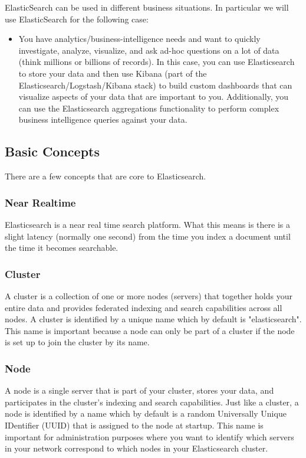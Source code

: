 \documentclass[a4paper, 12pt]{book}
\begin{document}
ElasticSearch can be used in different business situations. In particular we will use ElasticSearch for the following case:

\begin{itemize}
\item You have analytics/business-intelligence needs and want to quickly investigate, analyze, visualize, and ask ad-hoc questions on a lot of data (think millions or billions of records). In this case, you can use Elasticsearch to store your data and then use Kibana (part of the Elasticsearch/Logstash/Kibana stack) to build custom dashboards that can visualize aspects of your data that are important to you. Additionally, you can use the Elasticsearch aggregations functionality to perform complex business intelligence queries against your data.
\end{itemize}

\subsection{Basic Concepts}
There are a few concepts that are core to Elasticsearch.

\subsubsection{Near Realtime}
Elasticsearch is a near real time search platform. What this means is there is a slight latency (normally one second) from the time you index a document until the time it becomes searchable.

\subsubsection{Cluster}
A cluster is a collection of one or more nodes (servers) that together holds your entire data and provides federated indexing and search capabilities across all nodes. A cluster is identified by a unique name which by default is "elasticsearch". This name is important because a node can only be part of a cluster if the node is set up to join the cluster by its name.

\subsubsection{Node}
A node is a single server that is part of your cluster, stores your data, and participates in the cluster’s indexing and search capabilities. Just like a cluster, a node is identified by a name which by default is a random Universally Unique IDentifier (UUID) that is assigned to the node at startup. This name is important for administration purposes where you want to identify which servers in your network correspond to which nodes in your Elasticsearch cluster.
\end{document}
